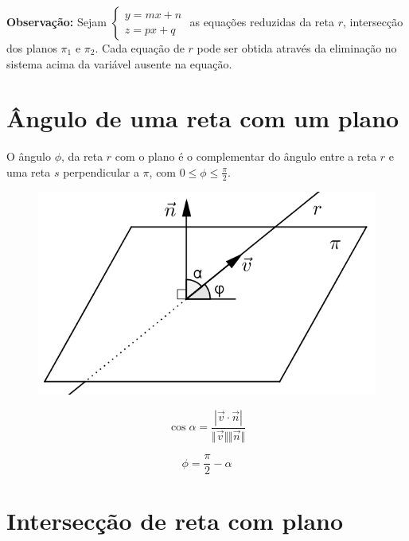 \textbf{Observação:} Sejam $\left\{ \begin{array}{l} y=mx+n\\   z=px+q \end{array} \right.$ as equações reduzidas da reta $r$, intersecção dos planos $\pi_1$ e $\pi_2$. Cada equação de $r$ pode ser obtida através da  eliminação no sistema acima da variável ausente na equação.

\section{Ângulo de uma reta com um plano}

O ângulo $\phi$, da reta $r$ com o plano é o complementar do ângulo entre a reta $r$ e uma reta $s$ perpendicular a $\pi$, com $0\leq \phi \leq \frac{\pi}{2}$.


\begin{multicols}{2}
\begin{figure}[H]
\centering
\includegraphics[scale=1]{analitica/imagens/plano-reta-a.png}
\end{figure}

$$\cos{\alpha}=\frac{|\vec v \cdot \vec n|}{\Vert \vec v \Vert \Vert \vec n \Vert}$$

$$\phi=\frac{\pi}{2}-\alpha$$

\end{multicols}




\section{Intersecção de reta com plano}

